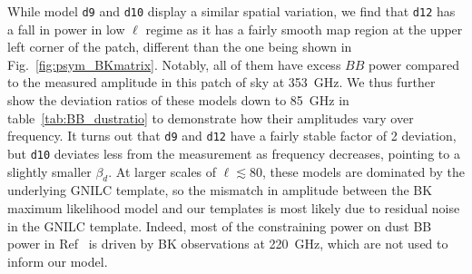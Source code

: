 \documentclass[twocolumn]{aastex631}
\newcommand{\done}{{\tt d1}}
\newcommand{\dnine}{{\tt d9}}
\begin{document}

While model \texttt{d9} and \texttt{d10} display a similar spatial variation, we find that \texttt{d12} has a fall in power in low $\ell$ regime as it has a fairly smooth map region at the upper left corner of the patch, different than the one being shown in Fig.~\ref{fig:psym_BKmatrix}. Notably, all of them have excess $BB$ power compared to the measured amplitude in this patch of sky at 353~GHz. We thus further show the deviation ratios of these models down to 85~GHz in table~\ref{tab:BB_dustratio} to demonstrate how their amplitudes vary over frequency. It turns out that \texttt{d9} and \texttt{d12} have a fairly stable factor of 2 deviation, but \texttt{d10} deviates less from the measurement as frequency decreases, pointing to a slightly smaller $\beta_d$. At larger scales of $\ell \lesssim 80$, these models are dominated by the underlying GNILC template, so the mismatch in amplitude between the BK maximum likelihood model and our templates is most likely due to residual noise in the GNILC template. Indeed, most of the constraining power on dust BB power in Ref~\cite{Ade:2021} is driven by BK observations at 220~GHz, which are not used to inform our model.

\end{document}
